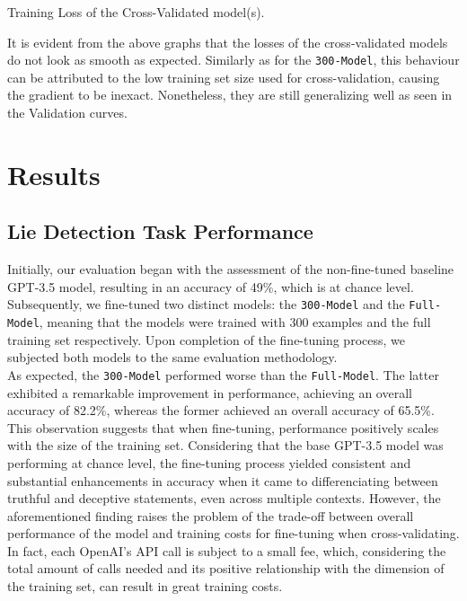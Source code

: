 \documentclass[10pt,twocolumn,letterpaper]{article}
\begin{document}
\begin{center}
    \small {Training Loss of the Cross-Validated model(s).} 
\end{center}

It is evident from the above graphs that the losses of the cross-validated models do not look as smooth as expected.
Similarly as for the \texttt{300-Model}, this behaviour can be attributed to the low training set size used for cross-validation, causing the gradient to be inexact.
Nonetheless, they are still generalizing well as seen in the Validation curves.

\section{Results}

\subsection{Lie Detection Task Performance}

Initially, our evaluation began with the assessment of the non-fine-tuned
baseline GPT-3.5 model, resulting in an accuracy of 49\%, which is at chance level. Subsequently,
we fine-tuned two distinct models: the \texttt{300-Model} and the \texttt{Full-Model}, meaning
that the models were trained with 300 examples and the full training set respectively.
Upon completion of the fine-tuning process, we subjected both models to the same evaluation methodology. \\

As expected, the \texttt{300-Model} performed worse than the \texttt{Full-Model}. The latter exhibited a 
remarkable improvement in performance, achieving an overall accuracy of 82.2\%, whereas the former achieved an overall accuracy of 65.5\%.
This observation suggests that when fine-tuning, performance positively scales with the size
of the training set. Considering that the base GPT-3.5 model was performing at chance level, the fine-tuning process
yielded consistent and substantial enhancements in accuracy when it came to differenciating
between truthful and deceptive statements, even across multiple contexts. 
However, the aforementioned finding raises the problem of the trade-off between overall performance of the model
and training costs for fine-tuning when cross-validating. In fact, each OpenAI's API call is subject to a small fee, which, considering 
the total amount of calls needed and its positive relationship with the dimension of the training set, can result in great training costs. \\
\end{document}
